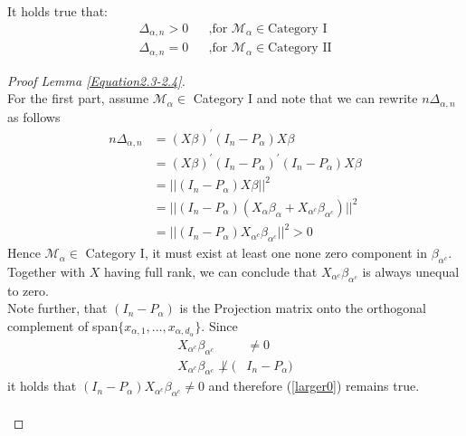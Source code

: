 \documentclass[Research_Module_ES.tex]{subfiles}
\begin{document}

\begin{lemma}
	\label{Equation2.3-2.4}
	It holds true that:
	\begin{align*}
	&&\Delta_{\alpha,n}>0 && \text{,for } \mathcal{M}_\alpha\in\text{Category I}&&\\
	&&\Delta_{\alpha,n}=0 && \text{,for } \mathcal{M}_\alpha\in\text{Category II}&&
	\end{align*}
\end{lemma}
\begin{proof}[Proof Lemma \ref{Equation2.3-2.4}]~\\
	For the first part, assume $\mathcal{M}_\alpha\in$ Category I and note that we can rewrite $n\Delta_{\alpha,n}$ as follows
	\begin{align}\nonumber
	n\Delta_{\alpha,n}&= \left(X \beta \right)^\prime \left(I_n-P_\alpha\right)X\beta\\\nonumber
	&= \left(X \beta \right)^\prime \left(I_n-P_\alpha\right)^\prime\left(I_n-P_\alpha\right)X\beta\\\nonumber
	&=||\left(I_n-P_\alpha\right)X\beta||^2\\\nonumber
	&=||\left(I_n-P_\alpha\right)(X_\alpha\beta_\alpha+X_{\alpha^c}\beta_{\alpha^c})||^2\\
	&=||\left(I_n-P_\alpha\right)X_{\alpha^c}\beta_{\alpha^c}||^2>0 \label{larger0}
	\end{align}
	Hence 
	$\mathcal{M}_\alpha\in$ Category I, it must exist at least one none zero component in $\beta_{\alpha^c}$. Together with $X$ having full rank, we can conclude that $X_{\alpha^c}\beta_{\alpha^c}$ is always unequal to zero.\\ 
	Note further, that $(I_n-P_\alpha)$ is the Projection matrix onto the orthogonal complement of span$\{x_{\alpha,1},\ldots,x_{\alpha,d_\alpha}\}$. Since
	\begin{align*}
		X_{\alpha^c}\beta_{\alpha^c}&\neq 0\\
		X_{\alpha^c}\beta_{\alpha^c}\not\perp (&I_n-P_\alpha)
	\end{align*}
	it holds that $(I_n-P_\alpha) X_{\alpha^c}\beta_{\alpha^c}\neq 0$ and therefore (\ref{larger0}) remains true.\\
	\\

\end{proof}
\end{document}
